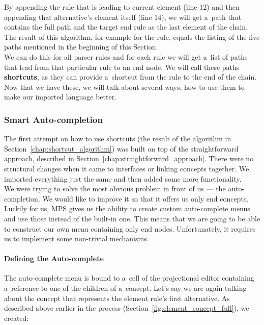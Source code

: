 By appending the rule that is leading to current element (line 12) and then appending that alternative's element itself (line 14), we will get a~path that contains the full path and the target end rule as the last element of the chain.
The result of this algorithm, for example for the  rule, equals the listing of the five paths mentioned in the beginning of this Section.
\\

We can do this for all parser rules and for each rule we will get a~list of paths that lead from that particular rule to an end node.
We will call these paths \textbf{shortcuts}, as they can provide a~shortcut from the rule to the end of the chain.
Now that we have these, we will talk about several ways, how to use them to make our imported language better.

\subsubsection{Smart Auto-completion}

The first attempt on how to use shortcuts (the result of the algorithm in Section~\ref{chap:shortcut_algorithm}) was built on top of the straightforward approach, described in Section~\ref{chap:straightforward_approach}.
There were no structural changes when it came to interfaces or linking concepts together.
We imported everything just the same and then added some more functionality.
\\

We were trying to solve the most obvious problem in front of us --- the auto-completion.
We would like to improve it so that it offers us only end concepts.
Luckily for us, MPS gives us the ability to create custom auto-complete menus and use those instead of the built-in one.
This means that we are going to be able to construct our own menu containing only end nodes.
Unfortunately, it requires us to implement some non-trivial mechanisms.

\paragraph{Defining the Auto-complete}

The auto-complete menu is bound to a~cell of the projectional editor containing a~reference to one of the children of a~concept.
Let's say we are again talking about the concept that represents the element rule's first alternative.
As described above earlier in the process (Section~\ref{fig:element_concept_full}), we created:

